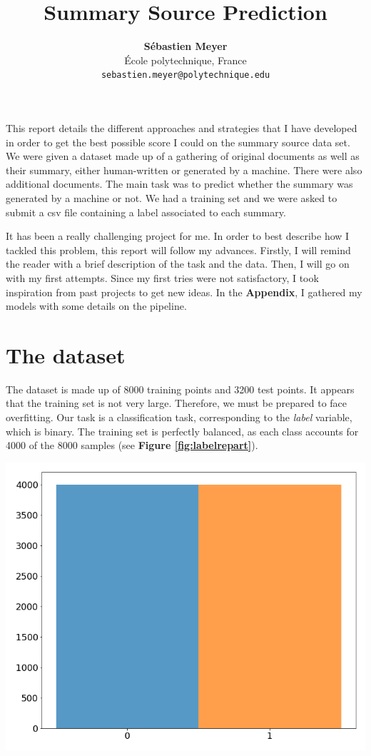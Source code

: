 \documentclass{article}
\title{Summary Source Prediction}
\author{
  \textbf{Sébastien Meyer} \\
  École polytechnique, France \\
  \texttt{sebastien.meyer@polytechnique.edu}
}
\date{}
\newenvironment{Figure}
  {\par\medskip\noindent\minipage{\linewidth}}
  {\endminipage\par\medskip}
\begin{document}
\maketitle

\begin{multicols}{2}

  This report details the different approaches and strategies that I have developed in order
  to get the best possible score I could on the summary source data set. We were given a
dataset made up of a
gathering of original documents as well as their summary, either human-written or generated by a machine. There were also additional documents. The main task was to predict whether the summary was generated by a machine or not. We had
a training set and we were asked to submit a csv file containing a label associated
to each
summary.

It has
been a really challenging project for me. In order
to best describe how I tackled this problem, this report will follow my advances. Firstly, I
will remind the reader with a brief description of the task and the data. Then, I will go on
with my first attempts. Since my first tries were not satisfactory,
I took inspiration from past projects to get
new ideas. In the 
\textbf{Appendix}, I gathered my models with some details on the
pipeline.

\section{The dataset}

The dataset is made up of 8000 training points and 3200 test points. It appears that the
training
set is not very large. Therefore, we
must be prepared to face overfitting. Our task is a classification task, corresponding to
the \textit{label} variable, which is binary. The training set is perfectly balanced, as each class accounts for
4000 of the 8000 samples (see \textbf{Figure \ref{fig:labelrepart}}).

\begin{Figure}
    \centering
    \captionsetup{type=figure}
    \includegraphics[width=0.7\linewidth]{figures/label_repart.png}
    \label{fig:labelrepart}
\end{Figure}


\end{multicols}
\end{document}
